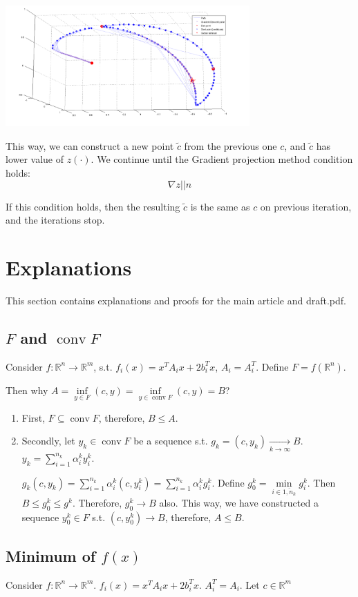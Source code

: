 \documentclass[a4paper]{article}
\DeclareMathOperator{\conv}{conv}
\begin{document}
\includegraphics[width=0.7\textwidth]{example03_cbad_91pts_04.png}

This way, we can construct a new point $\tilde{c}$ from the previous one $c$, and $\tilde{c}$ has lower value of $z(\cdot)$. We continue until the Gradient projection method condition holds:
$$\nabla z|| n$$

If this condition holds, then the resulting $\tilde{c}$ is the same as $c$ on previous iteration, and the iterations stop.

\section{Explanations}
This section contains explanations and proofs for the main article and draft.pdf.
\subsection{$F$ and $\conv F$}
Consider $f\colon \mathbb{R}^n\to\mathbb{R}^m$, s.t. $f_i(x)=x^TA_ix+2b_i^Tx$, $A_i=A_i^T$. Define $F=f(\mathbb{R}^n)$.

Then why $A=\inf \limits_{y\in F} (c,y)=\inf\limits_{y\in\conv F} (c,y)=B$?

\begin{enumerate}
\item First, $F\subseteq \conv F$, therefore, $B\leqslant A$.
\item Secondly, let $y_k\in \conv F$ be a sequence s.t. $g_k=(c,y_k)\underset{k\to\infty}{\longrightarrow} B$. $y_k=\sum\limits_{i=1}^{n_k}\alpha^k_iy^k_i$.

$g_k(c,y_k)=\sum\limits_{i=1}^{n_k}\alpha^k_i(c,y^k_i)=\sum\limits_{i=1}^{n_k}\alpha^k_i g^k_i$. Define $g^k_0=\min\limits_{i\in \overline{1,n_k}}g^k_i$. Then $B\leqslant g^k_0\leqslant g^k$. Therefore, $g^k_0\to B$ also. This way, we have constructed a sequence $y^k_0\in F$ s.t. $(c,y^k_0)\to B$, therefore, $A\leqslant B$.
\end{enumerate}

\subsection{Minimum of $f(x)$} \label{minimum}
Consider $f\colon \mathbb{R}^n\to\mathbb{R}^m$. $f_i(x)=x^TA_ix+2b_i^Tx$. $A_i^T=A_i$. Let $c\in\mathbb{R}^m$
\end{document}
